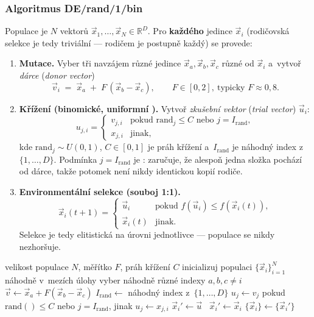 \documentclass[11pt,a4paper]{article}
\theoremstyle{definition}
\begin{document}
\subsubsection{Algoritmus DE/rand/1/bin}

Populace je $N$ vektorů $\vec x_{1},\dots,\vec x_{N} \in \mathbb{R}^D$.
Pro \textbf{každého} jedince $\vec x_i$ (rodičovská selekce je tedy triviální ---
rodičem je postupně každý) se provede:

\begin{enumerate}
\item \textbf{Mutace.} Vyber tři navzájem různé jedince
  $\vec x_{a}, \vec x_{b}, \vec x_{c}$ různé od $\vec x_i$ a~vytvoř
  \emph{dárce} (\emph{donor vector})
  \[
  \vec v_i \;=\; \vec x_{a} \;+\; F\,(\vec x_{b} - \vec x_{c}),
  \qquad F \in [0,2],\ \text{typicky } F \approx 0{,}8 .
  \]
\item \textbf{Křížení (binomické, uniformní ).}
  Vytvoř \emph{zkušební vektor} (\emph{trial vector}) $\vec u_i$:
  \[
  u_{j,i} =
  \begin{cases}
  v_{j,i} & \text{pokud } \mathrm{rand}_j \le C \text{ nebo } j = I_{\mathrm{rand}},\\[2pt]
  x_{j,i} & \text{jinak},
  \end{cases}
  \]
  kde $\mathrm{rand}_j \sim U(0,1)$, $C \in [0,1]$ je práh křížení
  a~$I_{\mathrm{rand}}$ je náhodný index z~$\{1,\dots,D\}$. Podmínka
  $j = I_{\mathrm{rand}}$ je : zaručuje, že alespoň jedna složka
  pochází od dárce, takže potomek není nikdy identickou kopií rodiče.
\item \textbf{Environmentální selekce (souboj 1:1).}
  \[
  \vec x_i(t+1) =
  \begin{cases}
  \vec u_i & \text{pokud } f(\vec u_i) \le f(\vec x_i(t)),\\
  \vec x_i(t) & \text{jinak.}
  \end{cases}
  \]
  Selekce je tedy elitistická na úrovni jednotlivce --- populace se nikdy
  nezhoršuje.
\end{enumerate}

\begin{algorithm}[!ht]
\caption{DE/rand/1/bin}
\begin{algorithmic}[1]
\Require velikost populace $N$, měřítko $F$, práh křížení $C$
\State inicializuj populaci $\{\vec x_i\}_{i=1}^{N}$ náhodně v~mezích úlohy
    \State vyber náhodně různé indexy $a,b,c \ne i$
    \State $\vec v \gets \vec x_a + F(\vec x_b - \vec x_c)$
    \State $I_{\mathrm{rand}} \gets$ náhodný index z~$\{1,\dots,D\}$
      \State $u_j \gets v_j$ pokud $\mathrm{rand}() \le C$ nebo $j = I_{\mathrm{rand}}$, jinak $u_j \gets x_{j,i}$
    \EndFor
     $\vec x_i' \gets \vec u$ \Else\ $\vec x_i' \gets \vec x_i$ \EndIf
  \EndFor
  \State $\{\vec x_i\} \gets \{\vec x_i'\}$
\EndWhile
\end{algorithmic}
\end{algorithm}
\end{document}
